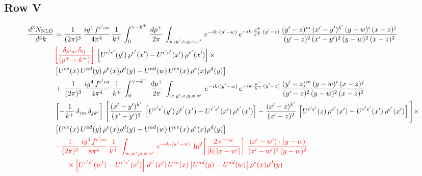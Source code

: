 \documentclass[9pt]{article}
\numberwithin{equation}{section}
\newcommand{\chg}[1]{{\color{red}#1}}
\begin{document}
\subsection{Row V}
\begin{align}
    \frac{d^{3}N_{\rm NLO}}{d^{3}k} & =  \frac{1}{(2\pi)^{3}}\, \frac{ig^{4}\,f^{c'ca}}{4\pi^{4}}\, \frac{1}{k^{+}}\,\int_{0}^{\vee-k^{+}}\, \frac{dp^{+}}{2\pi}\, \int_{w,y',z,y,x,x'}\, e^{-ik\cdot (y'-w)}\, e^{-ik\cdot \frac{p^{+}}{k^{+}}\,(y'-z)}\,\frac{(y'-z)^{m}\,(x'-y')^{k'}\,(y-w)^{i}\,(x-z)^{j}}{(y'-z)^{2}\,(x'-y')^{2}\,(y-w)^{2}\,(x-z)^{2}}\notag \\ & \chg{\left[\frac{\delta_{k'm}\,\delta_{ij}}{(p^{+}+k^{+})}\right]}\, \left[U^{c'e'}(y')\,\rho^{e'}(x')-U^{c'e'}(x')\,\rho^{e'}(x')\right]\times \notag \\ &  \left[U^{ce}(x)\,U^{ad}(y)\,\rho^{e}(x)\rho^{d}(y)-U^{ad}(w)\,U^{ce}(x)\,\rho^{e}(x)\rho^{d}(y)\right] \notag \\
&   +\,\frac{1}{(2\pi)^{3}}\, \frac{ig^{4}\,f^{c'ca}}{4\pi^{4}}\, \frac{1}{k^{+}}\,\int_{0}^{\vee-k^{+}}\, \frac{dp^{+}}{2\pi}\, \int_{w,y',z,y,x,x'}\, e^{-ik\cdot (y'-w)}\, e^{-ik\cdot \frac{p^{+}}{k^{+}}\,(y'-z)}\,\frac{(y'-z)^{m}\,(y-w)^{i}\,(x-z)^{j}}{(y'-z)^{2}\,(y-w)^{2}\,(x-z)^{2}}\notag \\ &   \left[-\frac{1}{k^{+}}\, \delta_{im}\, \delta_{jk'}\right]\, \Bigg[\frac{(x'-y')^{k'}}{(x'-y')^{2}}\,\left[U^{c'e'}(y')\,\rho^{e'}(x')-U^{c'e'}(x')\,\rho^{e'}(x')\right] -\frac{(x'-z)^{k'}}{(x'-z)^{2}}\,\left[U^{c'e'}(z)\,\rho^{e'}(x')-U^{c'e'}(x')\,\rho^{e'}(x')\right]\Bigg]\times\notag \\ &      \left[U^{ce}(x)\,U^{ad}(y)\,\rho^{e}(x)\rho^{d}(y)-U^{ad}(w)\,U^{ce}(x)\,\rho^{e}(x)\rho^{d}(y)\right]  \notag \\
& \chg{-\,\frac{1}{(2\pi)^{3}}\, \frac{ig^{4}\,f^{c'ca}}{8\pi^{4}}\, \frac{1}{k^{+}}\,\int_{w,w',y,x,x'}\, e^{-ik\cdot (w'-w)}\,\ln^{2}\!\left[\frac{2\,e^{-\gamma_{E}}}{|k|\,|x-w'|}\right]\,\frac{(x'-w')\cdot (y-w)}{(x'-w')^{2}\,(y-w)^{2}}}\notag \\ & \chg{\qquad\times\left[U^{c'e'}(w')-U^{c'e'}(x')\right]\rho^{e'}(x')\,U^{ce}(x)\left[U^{ad}(y)-U^{ad}(w)\right]\rho^{e}(x)\rho^{d}(y)}
\end{align}
\end{document}
